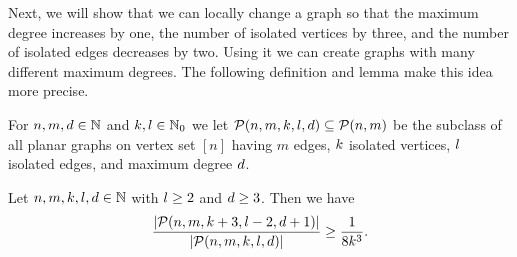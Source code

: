 Next, we will show that we can locally change a graph so that the maximum degree increases by one, the number of isolated vertices by three, and the number of isolated edges decreases by two. Using it we can create graphs with many different maximum degrees. The following definition and lemma make this idea more precise.
\begin{definition}
For $n,m,d \in \mathbb{N}$ and $k,l\in\mathbb{N}_0$ we let $\mathcal{P}(n,m,k,l,d)\subseteq\mathcal{P}(n,m)$ be the subclass of all planar graphs on vertex set $[n]$ having $m$ edges, $k$ isolated vertices, $l$ isolated edges, and maximum degree $d$.
\end{definition}

\begin{lem}\label{MDlem:increase_max_degree}
Let $n,m,k,l,d\in\mathbb{N}$ with $l\geq 2$ and $d\geq 3$. Then we have
\begin{align*}
\frac{\left|\mathcal{P}(n,m,k+3,l-2,d+1)\right|}{\left|\mathcal{P}(n,m,k,l,d)\right|}\geq \frac{1}{8k^3}.
\end{align*}
\end{lem}
